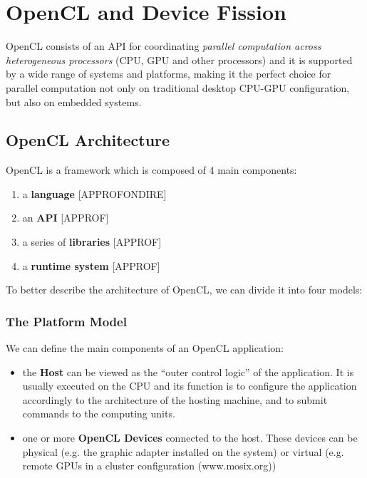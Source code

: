 \section{OpenCL and Device Fission}

OpenCL consists of an API for coordinating \textit{parallel computation across heterogeneous processors} (CPU, GPU and other processors) and it is supported by a wide range of systems and platforms, making it the perfect choice for parallel computation not only on traditional desktop CPU-GPU configuration, but also on embedded systems.


\subsection{OpenCL Architecture}

OpenCL is a framework which is composed of 4 main components:

\begin{enumerate}
	\item a \textbf{language} [APPROFONDIRE]
	\item an \textbf{API} [APPROF]
	\item a series of \textbf{libraries} [APPROF]
	\item a \textbf{runtime system} [APPROF]
\end{enumerate}

To better describe the architecture of OpenCL, we can divide it into four models:

\subsubsection{The Platform Model}
We can define the main components of an OpenCL application:

\begin{itemize}
	\item the \textbf{Host} can be viewed as the "`outer control logic"' of the application. It is usually executed on the CPU and its function is to configure the application accordingly to the architecture of the hosting machine, and to submit commands to the computing units.
	\item one or more \textbf{OpenCL Devices} connected to the host. These devices can be physical (e.g. the graphic adapter installed on the system) or virtual (e.g. remote GPUs in a cluster configuration (www.mosix.org))
\end{itemize}



